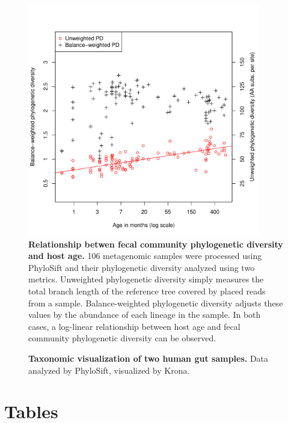 \documentclass[10pt]{article}
\begin{document}
\begin{figure}[hp]
\begin{center}
\includegraphics[width=4in]{figures/phylo_diversity.pdf}
\end{center}
\caption{\textbf{Relationship betwen fecal community phylogenetic diversity and host age.} 106 metagenomic samples were processed using PhyloSift and their phylogenetic diversity analyzed using two metrics. Unweighted phylogenetic diversity simply measures the total branch length of the reference tree covered by placed reads from a sample. Balance-weighted phylogenetic diversity adjusts these values by the abundance of each lineage in the sample. In both cases, a log-linear relationship between host age and fecal community phylogenetic diversity can be observed.}
\label{fig:agediversity}
\end{figure}

\begin{figure}[hp]
\begin{center}
\end{center}
\caption{\textbf{Taxonomic visualization of two human gut samples.} Data analyzed by PhyloSift, visualized by Krona.}
\label{fig:kronaplots}
\end{figure}

\clearpage

\section*{Tables}


\clearpage
\end{document}
